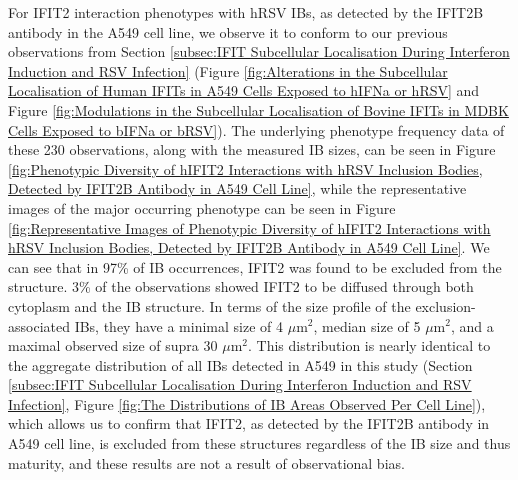 For IFIT2 interaction phenotypes with hRSV IBs, as detected by the IFIT2B antibody in the A549 cell line, we observe it to conform to our previous observations from Section \ref{subsec:IFIT Subcellular Localisation During Interferon Induction and RSV Infection} (Figure \ref{fig:Alterations in the Subcellular Localisation of Human IFITs in A549 Cells Exposed to hIFNa or hRSV} and Figure \ref{fig:Modulations in the Subcellular Localisation of Bovine IFITs in MDBK Cells Exposed to bIFNa or bRSV}). The underlying phenotype frequency data of these 230 observations, along with the measured IB sizes, can be seen in Figure \ref{fig:Phenotypic Diversity of hIFIT2 Interactions with hRSV Inclusion Bodies, Detected by IFIT2B Antibody in A549 Cell Line}, while the representative images of the major occurring phenotype can be seen in Figure \ref{fig:Representative Images of Phenotypic Diversity of hIFIT2 Interactions with hRSV Inclusion Bodies, Detected by IFIT2B Antibody in A549 Cell Line}. We can see that in 97\% of IB occurrences, IFIT2 was found to be excluded from the structure. 3\% of the observations showed IFIT2 to be diffused through both cytoplasm and the IB structure. In terms of the size profile of the exclusion-associated IBs, they have a minimal size of 4 \(\mu \mbox{m}^2\), median size of 5 \(\mu \mbox{m}^2\), and a maximal observed size of supra 30 \(\mu \mbox{m}^2\). This distribution is nearly identical to the aggregate distribution of all IBs detected in A549 in this study (Section \ref{subsec:IFIT Subcellular Localisation During Interferon Induction and RSV Infection}, Figure \ref{fig:The Distributions of IB Areas Observed Per Cell Line}), which allows us to confirm that IFIT2, as detected by the IFIT2B antibody in A549 cell line, is excluded from these structures regardless of the IB size and thus maturity, and these results are not a result of observational bias.

